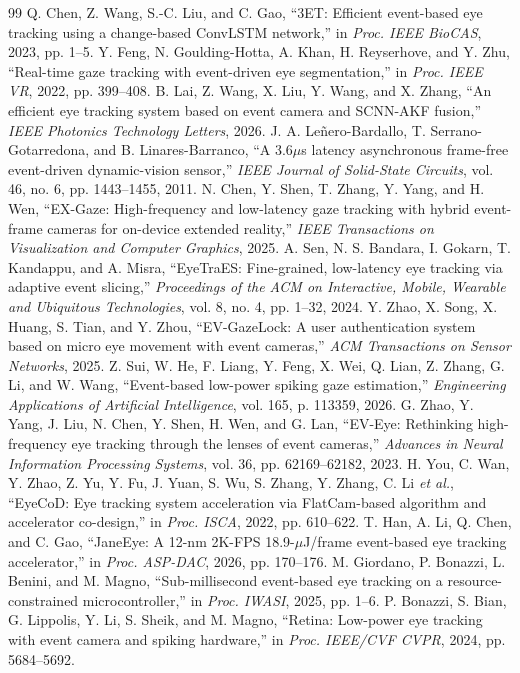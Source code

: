 \documentclass[journal]{IEEEtran}
\newcommand{\etal}{\textit{et al.}}
\begin{document}
\begin{thebibliography}{99}
 Q. Chen, Z. Wang, S.-C. Liu, and C. Gao, ``3ET: Efficient event-based eye tracking using a change-based ConvLSTM network,'' in \emph{Proc. IEEE BioCAS}, 2023, pp. 1--5.
 Y. Feng, N. Goulding-Hotta, A. Khan, H. Reyserhove, and Y. Zhu, ``Real-time gaze tracking with event-driven eye segmentation,'' in \emph{Proc. IEEE VR}, 2022, pp. 399--408.
 B. Lai, Z. Wang, X. Liu, Y. Wang, and X. Zhang, ``An efficient eye tracking system based on event camera and SCNN-AKF fusion,'' \emph{IEEE Photonics Technology Letters}, 2026.
 J. A. Le\~nero-Bardallo, T. Serrano-Gotarredona, and B. Linares-Barranco, ``A 3.6$\mu$s latency asynchronous frame-free event-driven dynamic-vision sensor,'' \emph{IEEE Journal of Solid-State Circuits}, vol. 46, no. 6, pp. 1443--1455, 2011.
 N. Chen, Y. Shen, T. Zhang, Y. Yang, and H. Wen, ``EX-Gaze: High-frequency and low-latency gaze tracking with hybrid event-frame cameras for on-device extended reality,'' \emph{IEEE Transactions on Visualization and Computer Graphics}, 2025.
 A. Sen, N. S. Bandara, I. Gokarn, T. Kandappu, and A. Misra, ``EyeTraES: Fine-grained, low-latency eye tracking via adaptive event slicing,'' \emph{Proceedings of the ACM on Interactive, Mobile, Wearable and Ubiquitous Technologies}, vol. 8, no. 4, pp. 1--32, 2024.
 Y. Zhao, X. Song, X. Huang, S. Tian, and Y. Zhou, ``EV-GazeLock: A user authentication system based on micro eye movement with event cameras,'' \emph{ACM Transactions on Sensor Networks}, 2025.
 Z. Sui, W. He, F. Liang, Y. Feng, X. Wei, Q. Lian, Z. Zhang, G. Li, and W. Wang, ``Event-based low-power spiking gaze estimation,'' \emph{Engineering Applications of Artificial Intelligence}, vol. 165, p. 113359, 2026.
 G. Zhao, Y. Yang, J. Liu, N. Chen, Y. Shen, H. Wen, and G. Lan, ``EV-Eye: Rethinking high-frequency eye tracking through the lenses of event cameras,'' \emph{Advances in Neural Information Processing Systems}, vol. 36, pp. 62169--62182, 2023.
 H. You, C. Wan, Y. Zhao, Z. Yu, Y. Fu, J. Yuan, S. Wu, S. Zhang, Y. Zhang, C. Li \etal, ``EyeCoD: Eye tracking system acceleration via FlatCam-based algorithm and accelerator co-design,'' in \emph{Proc. ISCA}, 2022, pp. 610--622.
 T. Han, A. Li, Q. Chen, and C. Gao, ``JaneEye: A 12-nm 2K-FPS 18.9-$\mu$J/frame event-based eye tracking accelerator,'' in \emph{Proc. ASP-DAC}, 2026, pp. 170--176.
 M. Giordano, P. Bonazzi, L. Benini, and M. Magno, ``Sub-millisecond event-based eye tracking on a resource-constrained microcontroller,'' in \emph{Proc. IWASI}, 2025, pp. 1--6.
 P. Bonazzi, S. Bian, G. Lippolis, Y. Li, S. Sheik, and M. Magno, ``Retina: Low-power eye tracking with event camera and spiking hardware,'' in \emph{Proc. IEEE/CVF CVPR}, 2024, pp. 5684--5692.
\end{thebibliography}
\end{document}
